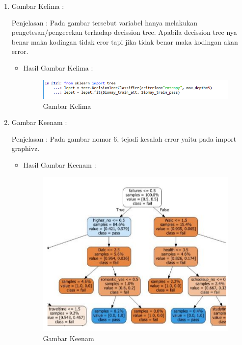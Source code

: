 \begin{itemize}
\begin{enumerate}
\begin{itemize}
\end{itemize}
\par
\item  Gambar Kelima :
\par Penjelasan : Pada gambar tersebut variabel hanya melakukan pengetesan/pengecekan terhadap decission tree. Apabila decission tree nya benar maka kodingan tidak eror tapi jika tidak benar maka kodingan akan error. 
\par 
\begin{itemize}
\par
\item Hasil  Gambar Kelima :

\begin{figure}[!hbtp]
\centering
\includegraphics[scale=0.7]{figures/AIP/jd5.PNG}
\caption{ Gambar Kelima}
\label{5}
\end{figure}


\end{itemize}
\item  Gambar Keenam :
\par Penjelasan : Pada gambar nomor 6, tejadi kesalah error yaitu pada import graphivz.
\par 
\begin{itemize}
\par
\item Hasil  Gambar Keenam :

\begin{figure}[!hbtp]
\centering
\includegraphics[scale=0.4]{figures/AIP/jd13.PNG}
\caption{ Gambar Keenam}
\label{13}
\end{figure}



\end{itemize}
\end{enumerate}
\end{itemize}
